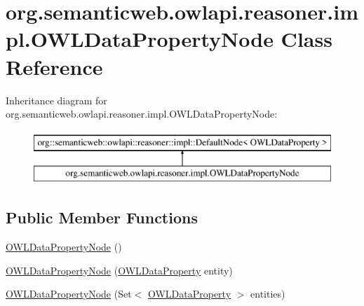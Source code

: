\hypertarget{classorg_1_1semanticweb_1_1owlapi_1_1reasoner_1_1impl_1_1_o_w_l_data_property_node}{\section{org.\-semanticweb.\-owlapi.\-reasoner.\-impl.\-O\-W\-L\-Data\-Property\-Node Class Reference}
\label{classorg_1_1semanticweb_1_1owlapi_1_1reasoner_1_1impl_1_1_o_w_l_data_property_node}
}
Inheritance diagram for org.\-semanticweb.\-owlapi.\-reasoner.\-impl.\-O\-W\-L\-Data\-Property\-Node\-:\begin{figure}[H]
\begin{center}
\leavevmode
\includegraphics[height=2.000000cm]{classorg_1_1semanticweb_1_1owlapi_1_1reasoner_1_1impl_1_1_o_w_l_data_property_node}
\end{center}
\end{figure}
\subsection*{Public Member Functions}
\begin{DoxyCompactItemize}
\item 
\hyperlink{classorg_1_1semanticweb_1_1owlapi_1_1reasoner_1_1impl_1_1_o_w_l_data_property_node_aab812dcf6f19478d0e3f7e9da95d06ff}{O\-W\-L\-Data\-Property\-Node} ()
\item 
\hyperlink{classorg_1_1semanticweb_1_1owlapi_1_1reasoner_1_1impl_1_1_o_w_l_data_property_node_a55774394bb90e061075d5cc1f580c164}{O\-W\-L\-Data\-Property\-Node} (\hyperlink{interfaceorg_1_1semanticweb_1_1owlapi_1_1model_1_1_o_w_l_data_property}{O\-W\-L\-Data\-Property} entity)
\item 
\hyperlink{classorg_1_1semanticweb_1_1owlapi_1_1reasoner_1_1impl_1_1_o_w_l_data_property_node_a5ea09a07bad7ea366381d7f241771d0b}{O\-W\-L\-Data\-Property\-Node} (Set$<$ \hyperlink{interfaceorg_1_1semanticweb_1_1owlapi_1_1model_1_1_o_w_l_data_property}{O\-W\-L\-Data\-Property} $>$ entities)
\end{DoxyCompactItemize}
